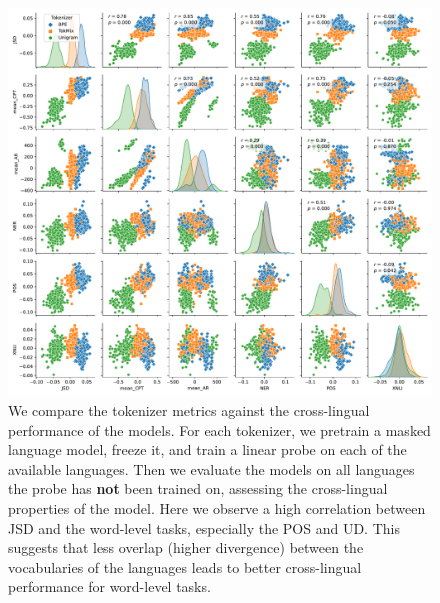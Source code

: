\begin{figure}
    \centering
    \includegraphics[width=\textwidth]{figures/X_pair_analysis_20L.pdf}
    \caption{We compare the tokenizer metrics against the cross-lingual performance of the models. For each tokenizer, we pretrain a masked language model, freeze it, and train a linear probe on each of the available languages. Then we evaluate the models on all languages the probe has \textbf{not} been trained on, assessing the cross-lingual properties of the model. Here we observe a high correlation between JSD and the word-level tasks, especially the POS and UD. This suggests that less overlap (higher divergence) between the vocabularies of the languages leads to better cross-lingual performance for word-level tasks.} 
    \label{fig:X_pair_analysis_20L}
\end{figure}



